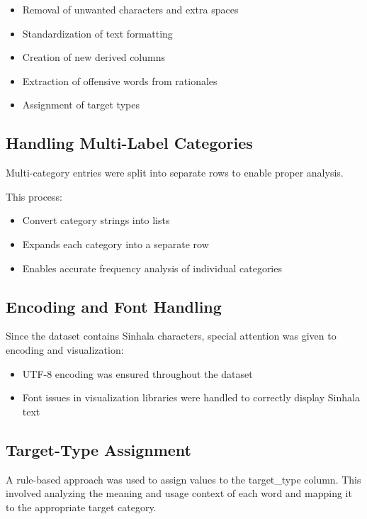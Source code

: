 \documentclass[12pt]{article}
\begin{document}
\begin{itemize}
    \item Removal of unwanted characters and extra spaces
    \item Standardization of text formatting
    \item Creation of new derived columns
    \item Extraction of offensive words from rationales
    \item Assignment of target types
\end{itemize}

\subsection{Handling Multi-Label Categories}

Multi-category entries were split into separate rows to enable proper analysis.

This process:
\begin{itemize}
    \item Convert category strings into lists
    \item Expands each category into a separate row
    \item Enables accurate frequency analysis of individual categories
\end{itemize}

\subsection{Encoding and Font Handling}

Since the dataset contains Sinhala characters, special attention was given to encoding and visualization:

\begin{itemize}
    \item UTF-8 encoding was ensured throughout the dataset
    \item Font issues in visualization libraries were handled to correctly display Sinhala text
\end{itemize}

\subsection{Target-Type Assignment}

A rule-based approach was used to assign values to the target\_type column. This involved analyzing the meaning and usage context of each word and mapping it to the appropriate target category.
\end{document}
